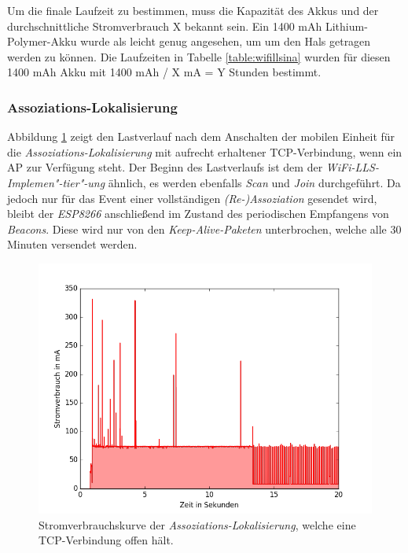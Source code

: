 Um die finale Laufzeit zu bestimmen, muss die Kapazität des Akkus und der durchschnittliche Stromverbrauch X bekannt sein.
Ein 1400 mAh Lithium-Polymer-Akku wurde als leicht genug angesehen, um um den Hals getragen werden zu können.
Die Laufzeiten in Tabelle \ref{table:wifillsina} wurden für diesen 1400 mAh Akku mit 1400 mAh / X mA = Y Stunden bestimmt.



\subsubsection{Assoziations-Lokalisierung}
\label{ch:phase1:sec:powerindirekt}
Abbildung \ref{fig:tcphold} zeigt den Lastverlauf nach dem Anschalten der mobilen Einheit für die \emph{Assoziations-Lokalisierung} mit aufrecht erhaltener TCP-Verbindung, wenn ein AP zur Verfügung steht. 
Der Beginn des Lastverlaufs ist dem der \emph{WiFi-LLS-Implemen"-tier"-ung} ähnlich, es werden ebenfalls \emph{Scan} und \emph{Join} durchgeführt.
Da jedoch nur für das Event einer vollständigen \emph{(Re-)Assoziation} gesendet wird, bleibt der \emph{ESP8266} anschließend im Zustand des periodischen Empfangens von \emph{Beacons}.
Diese wird nur von den \emph{Keep-Alive-Paketen} unterbrochen, welche alle 30 Minuten versendet werden.

\begin{figure}[h!]
  \centering
	\includegraphics[width=\textwidth]{plots/tcphold.png}
  \caption{Stromverbrauchskurve der \emph{Assoziations-Lokalisierung}, welche eine TCP-Verbindung offen hält.}
  \label{fig:tcphold}
\end{figure}

